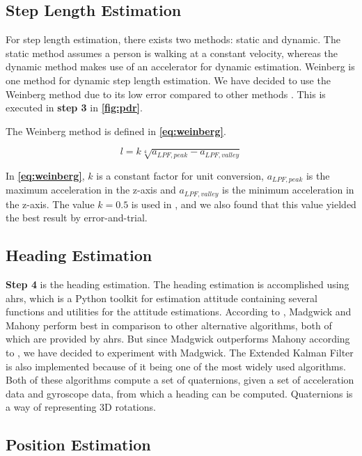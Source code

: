 \subsection{Step Length Estimation}

For step length estimation, there exists two methods: static and dynamic. The static method assumes a person is walking at a constant velocity, whereas the dynamic method makes use of an accelerator for dynamic estimation. Weinberg is one method for dynamic step length estimation. We have decided to use the Weinberg method due to its low error compared to other methods \cite{HybridPositioningPaper}. This is executed in \textbf{step 3} in \textbf{\autoref{fig:pdr}}.  

The Weinberg method is defined in \textbf{\autoref{eq:weinberg}}\cite{weinberg}.

\begin{equation} \label{eq:weinberg}
    l = k \sqrt[4]{a_{LPF, peak} - a_{LPF, valley}}
\end{equation}

In \textbf{\autoref{eq:weinberg}}, $k$ is a constant factor for unit conversion, $a_{LPF, peak}$ is the maximum acceleration in the z-axis and $a_{LPF, valley}$ is the minimum acceleration in the z-axis. The value $k = 0.5$ is used in \cite{HybridPositioningPaper}, and we also found that this value yielded the best result by error-and-trial.

\subsection{Heading Estimation}
\textbf{Step 4} is the heading estimation. The heading estimation is accomplished using \gls{ahrs}, which is a Python toolkit for estimation attitude containing several functions and utilities for the attitude estimations\cite{ahrs, FastAHRS}. According to \cite{MultisensorComparison}, Madgwick and Mahony perform best in comparison to other alternative algorithms, both of which are provided by \gls{ahrs}. But since Madgwick outperforms Mahony according to \cite{Ludwig2018ComparisonOA}, we have decided to experiment with Madgwick. The Extended Kalman Filter is also implemented because of it being one of the most widely used algorithms\cite{ahrs}. Both of these algorithms compute a set of quaternions, given a set of acceleration data and gyroscope data, from which a heading can be computed. Quaternions is a way of representing 3D rotations\cite{quaternion_math}.

\subsection{Position Estimation}

